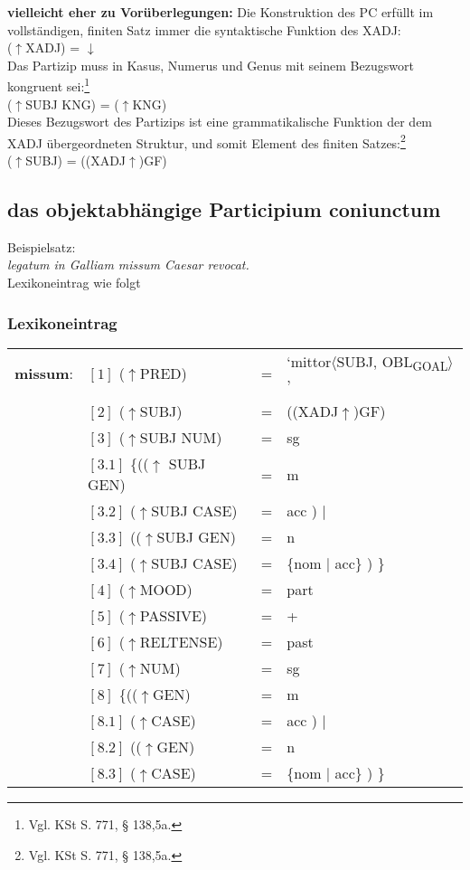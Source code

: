 \documentclass[12pt,a4paper]{article}
\begin{document}
\textbf{vielleicht eher zu Vorüberlegungen:} Die Konstruktion des PC erfüllt im vollständigen, finiten Satz immer die syntaktische Funktion des XADJ: \\ 
($\uparrow$XADJ) = $\downarrow$ \\
Das Partizip muss in Kasus, Numerus und Genus mit seinem Bezugswort kongruent sei:\footnote{Vgl. KSt S. 771, § 138,5a.}\\
($\uparrow$SUBJ KNG) = ($\uparrow$KNG)\\
Dieses Bezugswort des Partizips ist eine grammatikalische Funktion der dem XADJ übergeordneten Struktur, und somit Element des finiten Satzes:\footnote{Vgl. KSt S. 771, § 138,5a.}\\
($\uparrow$SUBJ) = ((XADJ$\uparrow$)GF) \\

\subsection{das objektabhängige Participium coniunctum}
Beispielsatz:\\
\textit{legatum in Galliam missum Caesar revocat.} \\
Lexikoneintrag wie folgt

\subsubsection{Lexikoneintrag}
\begin{singlespace}
\begin{tabular}{ l  l  l  l  } 
\textbf{missum}: & $[1]$ \:  ($\uparrow$PRED) & = & `mittor$\langle$SUBJ, OBL\textsubscript{GOAL}$\rangle$'\\
$\qquad$ & $[2]$ \:  ($\uparrow$SUBJ) & = & ((XADJ$\uparrow$)GF)\\
$\qquad$ & $[3]$ \:  ($\uparrow$SUBJ NUM) & = & sg \\
$\qquad$ & $[3.1]$ \:  \{(($\uparrow$ SUBJ GEN) & = & m \\ 
$\qquad$ & $[3.2]$ \:  ($\uparrow$SUBJ CASE) & = & acc ) $\mid$\\
$\qquad$ & $[3.3]$ \: (($\uparrow$SUBJ GEN) & = & n \\
$\qquad$ & $[3.4]$ \:  ($\uparrow$SUBJ CASE) & = & \{nom $\mid$ acc\} ) \}\\
$\qquad$ & $[4]$ \:  ($\uparrow$MOOD) & = & part\\
$\qquad$ & $[5]$ \:  ($\uparrow$PASSIVE) & = & + \\
$\qquad$ & $[6]$ \:  ($\uparrow$RELTENSE) & = & past \\
$\qquad$ & $[7]$ \:  ($\uparrow$NUM) & = & sg \\
$\qquad$ & $[8]$ \:  \{(($\uparrow$GEN) & = & m \\ 
$\qquad$ & $[8.1]$ \:  ($\uparrow$CASE) & = & acc ) $\mid$\\
$\qquad$ & $[8.2]$ \: (($\uparrow$GEN) & = & n \\
$\qquad$ & $[8.3]$ \:  ($\uparrow$CASE) & = & \{nom $\mid$ acc\} ) \}\\
\end{tabular}
\newline
\newline
\end{singlespace}
\end{document}
